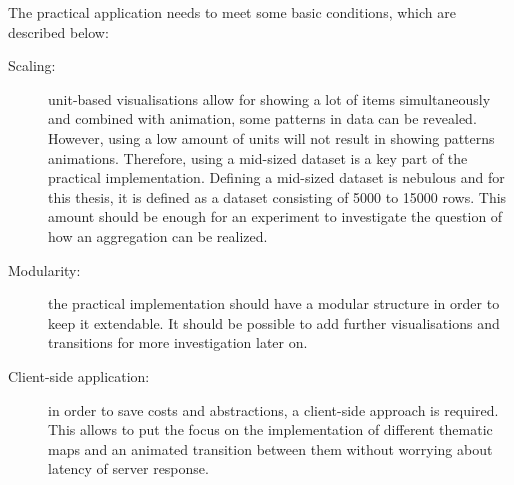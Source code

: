 The practical application needs to meet some basic conditions, which are described below:

\begin{description}
\item[Scaling:] unit-based visualisations allow for showing a lot of items simultaneously and combined with animation, some patterns in data can be revealed. However, using a low amount of units will not result in showing patterns animations. Therefore, using a mid-sized dataset is a key part of the practical implementation. Defining a mid-sized dataset is nebulous and for this thesis, it is defined as a dataset consisting of 5000 to 15000 rows. This amount should be enough for an experiment to investigate the question of how an aggregation can be realized.

\item[Modularity:] the practical implementation should have a modular structure in order to keep it extendable. It should be possible to add further visualisations and transitions for more investigation later on.

\item[Client-side application:] in order to save costs and abstractions, a client-side approach is required. This allows to put the focus on the implementation of different thematic maps and an animated transition between them without worrying about latency of server response.

\end{description}